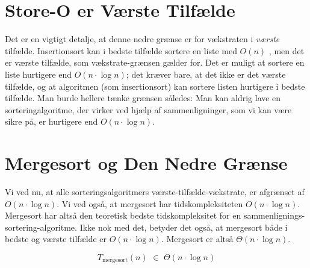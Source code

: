 \section{Store-O er Værste Tilfælde}
\label{sec:Store-O er Værste Tilfælde}

Det er en vigtigt detalje, at denne nedre grænse er for vækstraten i \emph{værste} tilfælde. Insertionsort kan i bedste tilfælde sortere en liste med $O(n)$ \cite{big-o-cheatsheet}, men det er værste tilfælde, som vækstrate-grænsen gælder for. Det er muligt at sortere en liste hurtigere end $O(n \cdot \log n)$; det kræver bare, at det ikke er det værste tilfælde, og at algoritmen (som insertionsort) kan sortere listen hurtigere i bedste tilfælde. Man burde hellere tænke grænsen således: Man kan aldrig lave en sorteringalgoritme, der virker ved hjælp af sammenligninger, som vi kan være sikre på, er hurtigere end $O(n \cdot \log n)$.

\section{Mergesort og Den Nedre Grænse}
\label{sec:Mergesort og Den Nedre Grænse}

Vi ved nu, at alle sorteringsalgoritmers værste-tilfælde-vækstrate, er afgrænset af $O(n \cdot \log n)$. Vi ved også, at mergesort har tidskompleksiteten $O (n \cdot \log n)$. Mergesort har altså den teoretisk bedste tidskompleksitet for en sammenlignings-sortering-algoritme. Ikke nok med det, betyder det også, at mergesort både i bedste og værste tilfælde er $O(n \cdot \log n)$. Mergesort er altså $\Theta (n \cdot \log n)$.


$$T_{\text{mergesort}}(n) \,\,\in\,\, \Theta (n \cdot \log n)$$






